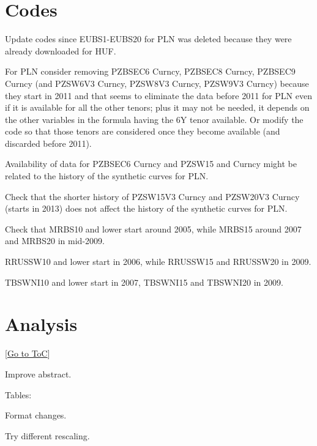\documentclass[12pt]{article}
\newcommand{\gototoc}{\vspace{-1.8cm} \null\hfill [\hyperlink{toc}{Go to ToC}] \newline}
\newcommand{\cmark}{\ding{51}}
\newcommand{\done}{\rlap{$\square$}{\raisebox{2pt}{\large\hspace{1pt}\cmark}}%
	\hspace{-2.5pt}}
\begin{document}
\section{Codes}
\begin{todolist}
	\item Update codes since EUBS1-EUBS20 for PLN was deleted because they were already downloaded for HUF.
	\item For PLN consider removing PZBSEC6 Curncy, PZBSEC8 Curncy, PZBSEC9 Curncy (and PZSW6V3 Curncy, PZSW8V3 Curncy, PZSW9V3 Curncy) because they start in 2011 and that seems to eliminate the data before 2011 for PLN even if it is available for all the other tenors; plus it may not be needed, it depends on the other variables in the formula having the 6Y tenor available. Or modify the code so that those tenors are considered once they become available (and discarded before 2011).
	\item Availability of data for PZBSEC6 Curncy and PZSW15 and Curncy might be related to the history of the synthetic curves for PLN.
	\item Check that the shorter history of PZSW15V3 Curncy and PZSW20V3 Curncy (starts in 2013) does not affect the history of the synthetic curves for PLN.
	\item Check that MRBS10 and lower start around 2005, while MRBS15 around 2007 and MRBS20 in mid-2009.
	\item RRUSSW10 and lower start in 2006, while RRUSSW15 and RRUSSW20 in 2009.
	\item TBSWNI10  and lower start in 2007, TBSWNI15 and TBSWNI20 in 2009.
\end{todolist}

\section{Analysis}
\gototoc
\begin{todolist}
	\item[\done] Improve abstract.
	\item Tables:
	\begin{todolist}
		\item Format changes.
		\item Try different rescaling.
	\end{todolist}
\end{todolist}
\end{document}
